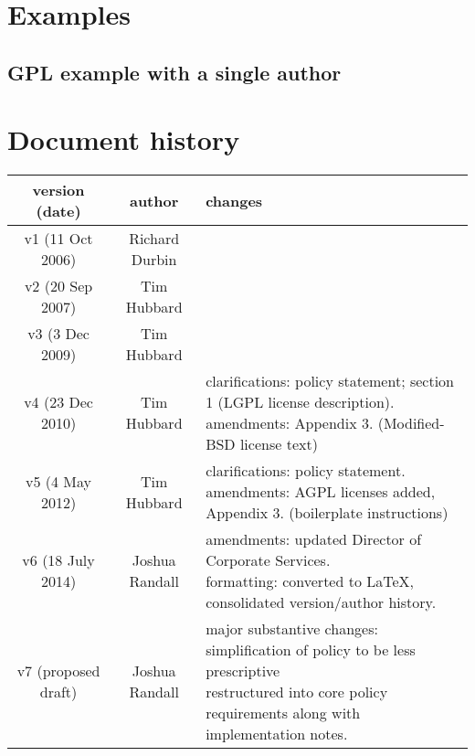 \documentclass[10pt,a4paper]{article}
\begin{document}
\begin{boilerplate}

\end{boilerplate}



\section{Examples}
\label{appendix:examples}

\subsection{GPL example with a single author}
\begin{boilerplate}

\end{boilerplate}




\section*{Document history}

\begin{tabular}{|c|c|p{6cm}|}
\hline
\textbf{version (date)}	& \textbf{author}	& \textbf{changes} \\
\hline
v1 (11 Oct 2006)		& Richard Durbin	& \parbox{6cm}{
} \\
\hline
v2 (20 Sep 2007)		& Tim Hubbard		& \parbox{6cm}{
} \\
\hline
v3 (3 Dec 2009)		& Tim Hubbard		& \parbox{6cm}{
} \\
\hline
v4 (23 Dec 2010) 		& Tim Hubbard		& \parbox{6cm}{
clarifications: policy statement; section 1 (LGPL license description). \\
amendments: Appendix 3. (Modified-BSD license text) \\
} \\
\hline
v5 (4 May 2012)		& Tim Hubbard		& \parbox{6cm}{
clarifications: policy statement. \\
amendments: AGPL licenses added, Appendix 3. (boilerplate instructions) \\
} \\
\hline
v6 (18 July 2014)		& Joshua Randall	& \parbox{6cm}{
amendments: updated Director of Corporate Services. \\
formatting: converted to LaTeX, consolidated version/author history. \\
} \\
\hline
v7 (proposed draft)		& Joshua Randall	& \parbox{6cm}{
major substantive changes: simplification of policy to be less prescriptive\\
restructured into core policy requirements along with implementation notes. 
} \\
\hline
\end{tabular}
\end{document}
